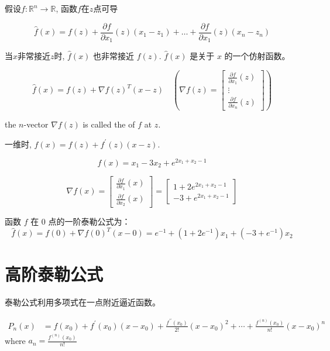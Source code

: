 \begin{definition}[一阶泰勒公式]
    假设$ f: \mathbb{R}^{n} \rightarrow \mathbb{R} $, 函数$f$在$z$点可导

    $$ \hat{f}(x)=f(z)+\frac{\partial f}{\partial x_{1}}(z)\left(x_{1}-z_{1}\right)+\ldots+\frac{\partial f}{\partial x_{1}}(z)\left(x_{n}-z_{n}\right) $$
\end{definition}

当$x$非常接近$z$时, $ \hat{f}(x) $ 也非常接近 $ f(z) $.  
$ \hat{f}(x) $ 是关于 $ x $ 的一个仿射函数。 

\begin{corollary}[一阶泰勒公式的内积形式]
    $$ \hat{f}(x)=f(z)+\nabla f(z)^{T}(x-z) \quad (\nabla f(z)=\left[\begin{array}{c}\frac{\partial f}{\partial x_{1}}(z) \\ \vdots \\ \frac{\partial f}{\partial x_{n}}(z)\end{array}\right]) $$

    the $ n $-vector $ \nabla f(z) $ is called the  of $ f $ at $ z $.
\end{corollary} 

一维时, $ \hat{f}(x)=f(z)+f^{\prime}(z)(x-z) $.

\begin{example}
    $$ f(x)=x_{1}-3 x_{2}+e^{2 x_{1}+x_{2}-1} $$

    $$ \nabla f(x)=\left[\begin{array}{l}\frac{\partial f}{\partial x_{1}}(x) \\ \frac{\partial f}{\partial x_{2}}(x)\end{array}\right]=\left[\begin{array}{l}1+2 e^{2 x_{1}+x_{2}-1} \\ -3+e^{2 x_{1}+x_{2}-1}\end{array}\right] $$

    函数 $ f $ 在 0 点的一阶泰勒公式为：
    $$ \hat{f}(x)=f(0)+\nabla f(0)^{T}(x-0)=e^{-1}+\left(1+2 e^{-1}\right) x_{1}+\left(-3+e^{-1}\right) x_{2} $$
\end{example}

\section{高阶泰勒公式}

    泰勒公式利用多项式在一点附近逼近函数。
    


\begin{corollary}[$n$阶泰勒多项式]
    $$ \begin{aligned} P_{n}(x) &=f\left(x_{0}\right)+f^{\prime}\left(x_{0}\right)\left(x-x_{0}\right)+\frac{f^{\prime \prime}\left(x_{0}\right)}{2 !}\left(x-x_{0}\right)^{2} +\cdots+\frac{f^{(n)}\left(x_{0}\right)}{n !}\left(x-x_{0}\right)^{n} \end{aligned} $$
    where $a_{n}=\frac{f^{(n)}\left(x_{0}\right)}{n !} $
\end{corollary}

